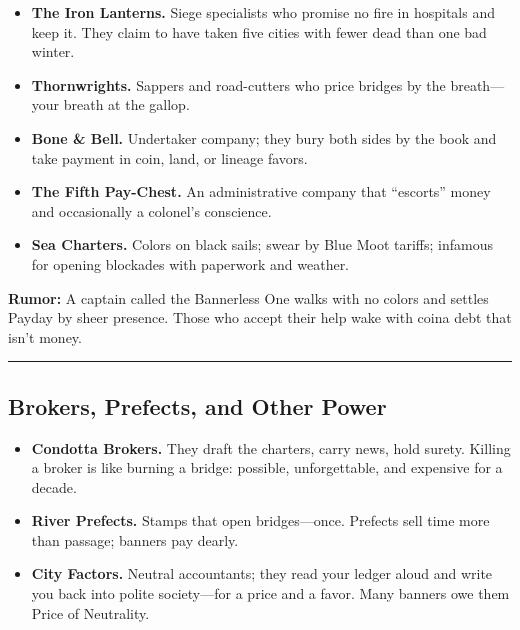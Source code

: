 \documentclass[11pt]{article}
\begin{document}
\begin{itemize}
    \item \textbf{The Iron Lanterns.} Siege specialists who promise no fire in hospitals and keep it. They claim to have taken five cities with fewer dead than one bad winter.
    
    \item \textbf{Thornwrights.} Sappers and road-cutters who price bridges by the breath---your breath at the gallop.
    
    \item \textbf{Bone \& Bell.} Undertaker company; they bury both sides by the book and take payment in coin, land, or lineage favors.
    
    \item \textbf{The Fifth Pay-Chest.} An administrative company that ``escorts'' money and occasionally a colonel's conscience.
    
    \item \textbf{Sea Charters.} Colors on black sails; swear by Blue Moot tariffs; infamous for opening blockades with paperwork and weather.
\end{itemize}

\textbf{Rumor:} A captain called the Bannerless One walks with no colors and settles Payday by sheer presence. Those who accept their help wake with coin\dotsand a debt that isn't money.

\rule{\textwidth}{0.4pt}

\subsection*{Brokers, Prefects, and Other Power}

\begin{itemize}
    \item \textbf{Condotta Brokers.} They draft the charters, carry news, hold surety. Killing a broker is like burning a bridge: possible, unforgettable, and expensive for a decade.
    
    \item \textbf{River Prefects.} Stamps that open bridges---once. Prefects sell time more than passage; banners pay dearly.
    
    \item \textbf{City Factors.} Neutral accountants; they read your ledger aloud and write you back into polite society---for a price and a favor. Many banners owe them Price of Neutrality.
\end{itemize}
\end{document}
